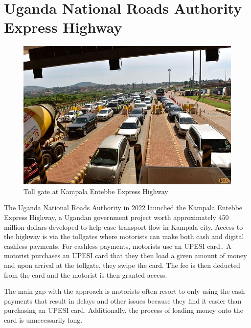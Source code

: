 \section{Uganda National Roads Authority Express Highway}
\begin{figure}[h]
    \begin{center}
        \includegraphics[scale = 0.3]{images/ebbs}
        \caption{Toll gate at Kampala Entebbe Express Highway}
    \end{center}
\end{figure}
The Uganda National Roads Authority in 2022 launched the Kampala Entebbe Express Highway, a Ugandan government project worth approximately 450 million dollars developed to help ease transport flow in Kampala city. Access to the highway is via the tollgates where motorists can make both cash and digital cashless payments. For cashless payments, motorists use an UPESI card.\cite{unra_news_2022}. A motorist purchases an UPESI card that they then load a given amount of money and upon arrival at the tollgate, they swipe the card. The fee is then deducted from the card and the motorist is then granted access.

The main gap with the approach is motorists often resort to only using the cash payments that result in delays and other issues because they find it easier than purchasing an UPESI card. Additionally, the process of loading money onto the card is unnecessarily long.


